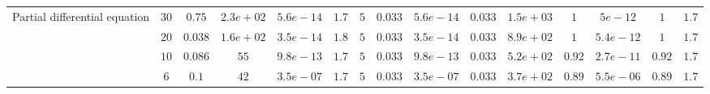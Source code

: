 \begin{table*}[t]
\begin{tabular}{|p{1.5cm}|c|c|c|c|c|c|c|c|c|c|c|c|c|c|}
\multirow{4}{*}{\parbox{1.5cm}{Partial differential equation}} 
& $30$ 
& $0.75$ & $2.3e+02$ 
&$5.6e-14$& $1.7$ &{$5$} 
&$0.033$ &$5.6e-14$ &$0.033$ &$1.5e+03$ 
&$1$ &$5e-12$ &$1$ &$1.7$ \\ 
\cline{2-15} 
& $20$ 
& $0.038$ & $1.6e+02$ 
&$3.5e-14$& $1.8$ &{$5$} 
&$0.033$ &$3.5e-14$ &$0.033$ &$8.9e+02$ 
&$1$ &$5.4e-12$ &$1$ &$1.7$ \\ 
\cline{2-15} 
& $10$ 
& $0.086$ & $55$ 
&$9.8e-13$& $1.7$ &{$5$} 
&$0.033$ &$9.8e-13$ &$0.033$ &$5.2e+02$ 
&$0.92$ &$2.7e-11$ &$0.92$ &$1.7$ \\ 
\cline{2-15} 
& $6$ 
& $0.1$ & $42$ 
&$3.5e-07$& $1.7$ &{$5$} 
&$0.033$ &$3.5e-07$ &$0.033$ &$3.7e+02$ 
&$0.89$ &$5.5e-06$ &$0.89$ &$1.7$ \\ 
\hline 


\end{tabular}
\end{table*}
